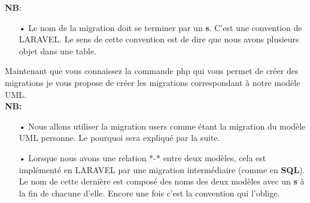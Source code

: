 \documentclass[12pt,a4paper]{article}
\begin{document}
\textbf{NB}:

\begin{itemize}

\item[•]  Le nom de la migration doit se terminer par un \textbf{s}. C'est une convention de LARAVEL. Le sens de cette convention est de dire que nous avons plusieurs objet dans une table. 

\end{itemize}

Maintenant que vous connaissez la commande php qui vous permet de créer des migrations je vous propose de créer les migrations correspondant à notre modèle UML.\\

\textbf{
NB:}


\begin{itemize}

\item[•] Nous allons utiliser la migration users comme étant la migration du modèle UML personne. Le pourquoi sera expliqué par la suite.\\

\item[•] Lorsque nous avons une relation *-* entre deux modèles, cela est implémenté en LARAVEL par une migration intermédiaire (comme en \textbf{SQL}). Le nom de cette dernière est composé des noms des deux modèles avec un \textbf{s} à la fin de 
chacune d'elle. Encore une fois c'est la convention qui l'oblige.

\end{itemize}
\end{document}
